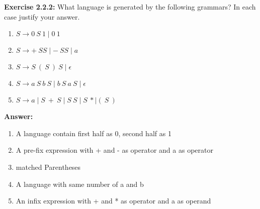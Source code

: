 \documentclass{article}
\begin{document}
\textbf{Exercise 2.2.2:} What language is generated by the following grammars? In each case justify your answer.
\begin{enumerate}[label=\textbf{\alph*)}]
	\item $S \to 0\ S\ 1 \mid 0\ 1$
	\item $S \to +\ SS \mid -\ SS \mid a$
	\item $S \to S\ (\ S\ )\ S \mid \epsilon$
	\item $S \to a\ S\ b\ S \mid b\ S\ a\ S \mid \epsilon$
	\item $S \to a \mid S\ +\ S \mid S\ S \mid S\ * \mid (\ S\ )$
\end{enumerate}
\textbf{Answer:}
\begin{enumerate}[label=\textbf{\alph*)}]
	\item A language contain first half as 0, second half as 1
	\item A pre-fix expression with + and - as operator and a as operator
	\item matched Parentheses
	\item A language with same number of a and b
	\item An infix expression with + and * as operator and a as operand
\end{enumerate}
\end{document}
